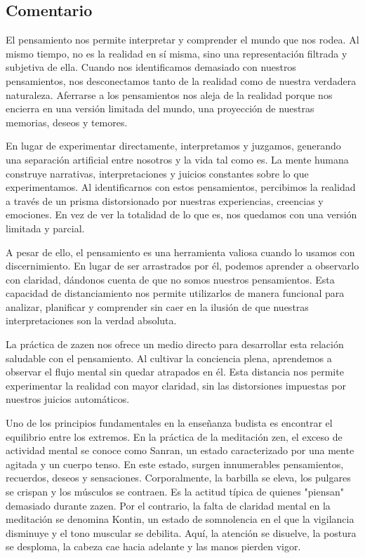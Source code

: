 \documentclass[
  a5paperpaper,
]{article}
\begin{document}
\hfill\break

\hypertarget{comentario-35}{%
\subsection{Comentario}\label{comentario-35}}

El pensamiento nos permite interpretar y comprender el mundo que nos
rodea. Al mismo tiempo, no es la realidad en sí misma, sino una
representación filtrada y subjetiva de ella. Cuando nos identificamos
demasiado con nuestros pensamientos, nos desconectamos tanto de la
realidad como de nuestra verdadera naturaleza. Aferrarse a los
pensamientos nos aleja de la realidad porque nos encierra en una versión
limitada del mundo, una proyección de nuestras memorias, deseos y
temores.

En lugar de experimentar directamente, interpretamos y juzgamos,
generando una separación artificial entre nosotros y la vida tal como
es. La mente humana construye narrativas, interpretaciones y juicios
constantes sobre lo que experimentamos. Al identificarnos con estos
pensamientos, percibimos la realidad a través de un prisma distorsionado
por nuestras experiencias, creencias y emociones. En vez de ver la
totalidad de lo que es, nos quedamos con una versión limitada y parcial.

A pesar de ello, el pensamiento es una herramienta valiosa cuando lo
usamos con discernimiento. En lugar de ser arrastrados por él, podemos
aprender a observarlo con claridad, dándonos cuenta de que no somos
nuestros pensamientos. Esta capacidad de distanciamiento nos permite
utilizarlos de manera funcional para analizar, planificar y comprender
sin caer en la ilusión de que nuestras interpretaciones son la verdad
absoluta.

La práctica de zazen nos ofrece un medio directo para desarrollar esta
relación saludable con el pensamiento. Al cultivar la conciencia plena,
aprendemos a observar el flujo mental sin quedar atrapados en él. Esta
distancia nos permite experimentar la realidad con mayor claridad, sin
las distorsiones impuestas por nuestros juicios automáticos.

Uno de los principios fundamentales en la enseñanza budista es encontrar
el equilibrio entre los extremos. En la práctica de la meditación zen,
el exceso de actividad mental se conoce como Sanran, un estado
caracterizado por una mente agitada y un cuerpo tenso. En este estado,
surgen innumerables pensamientos, recuerdos, deseos y sensaciones.
Corporalmente, la barbilla se eleva, los pulgares se crispan y los
músculos se contraen. Es la actitud típica de quienes "piensan"
demasiado durante zazen. Por el contrario, la falta de claridad mental
en la meditación se denomina Kontin, un estado de somnolencia en el que
la vigilancia disminuye y el tono muscular se debilita. Aquí, la
atención se disuelve, la postura se desploma, la cabeza cae hacia
adelante y las manos pierden vigor.
\end{document}
